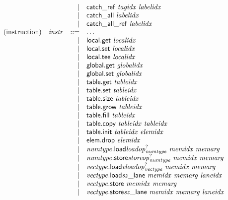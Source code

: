 $$\begin{array}[t]{@{}lrrl@{}l@{}}
& & | & \mathsf{catch\_ref}~{\mathit{tagidx}}~{\mathit{labelidx}} \\
& & | & \mathsf{catch\_all}~{\mathit{labelidx}} \\
& & | & \mathsf{catch\_all\_ref}~{\mathit{labelidx}} \\
\mbox{(instruction)} & {\mathit{instr}} & ::= & \dots \\
& & | & \mathsf{local{.}get}~{\mathit{localidx}} \\
& & | & \mathsf{local{.}set}~{\mathit{localidx}} \\
& & | & \mathsf{local{.}tee}~{\mathit{localidx}} \\
& & | & \mathsf{global{.}get}~{\mathit{globalidx}} \\
& & | & \mathsf{global{.}set}~{\mathit{globalidx}} \\
& & | & \mathsf{table{.}get}~{\mathit{tableidx}} \\
& & | & \mathsf{table{.}set}~{\mathit{tableidx}} \\
& & | & \mathsf{table{.}size}~{\mathit{tableidx}} \\
& & | & \mathsf{table{.}grow}~{\mathit{tableidx}} \\
& & | & \mathsf{table{.}fill}~{\mathit{tableidx}} \\
& & | & \mathsf{table{.}copy}~{\mathit{tableidx}}~{\mathit{tableidx}} \\
& & | & \mathsf{table{.}init}~{\mathit{tableidx}}~{\mathit{elemidx}} \\
& & | & \mathsf{elem{.}drop}~{\mathit{elemidx}} \\
& & | & {{\mathit{numtype}}{.}\mathsf{load}}{{{{\mathit{loadop}}}_{{\mathit{numtype}}}^?}}~{\mathit{memidx}}~{\mathit{memarg}} \\
& & | & {{\mathit{numtype}}{.}\mathsf{store}}{{{{\mathit{storeop}}}_{{\mathit{numtype}}}^?}}~{\mathit{memidx}}~{\mathit{memarg}} \\
& & | & {{\mathit{vectype}}{.}\mathsf{load}}{{{{\mathit{vloadop}}}_{{\mathit{vectype}}}^?}}~{\mathit{memidx}}~{\mathit{memarg}} \\
& & | & {{\mathit{vectype}}{.}\mathsf{load}}{{\mathit{sz}}}{\mathsf{\_}}{\mathsf{lane}}~{\mathit{memidx}}~{\mathit{memarg}}~{\mathit{laneidx}} \\
& & | & {\mathit{vectype}}{.}\mathsf{store}~{\mathit{memidx}}~{\mathit{memarg}} \\
& & | & {{\mathit{vectype}}{.}\mathsf{store}}{{\mathit{sz}}}{\mathsf{\_}}{\mathsf{lane}}~{\mathit{memidx}}~{\mathit{memarg}}~{\mathit{laneidx}} \\

\end{array}$$
